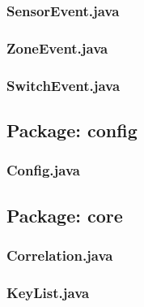 \subsubsection{SensorEvent.java}

\subsubsection{ZoneEvent.java}

\subsubsection{SwitchEvent.java}



\subsection{Package: config}
\subsubsection{Config.java}


\subsection{Package: core}
\subsubsection{Correlation.java}

\subsubsection{KeyList.java}


